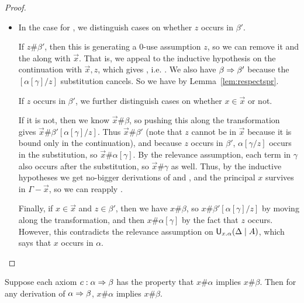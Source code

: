 \begin{proof}
\begin{itemize}
\item In the case for \UL, we distinguish cases on whether $z$ occurs in
  $\beta'$.  

  If $z \# \beta'$, then this \UL is generating a 0-use assumption $z$, so
  we can remove it and the \UL along with $\vec{x}$.  That is, we appeal
  to the inductive hypothesis on the continuation with $\vec{x},z$,
  which gives , i.e.
  .  We also have $\beta \Rightarrow \beta'$
  because the $[\alpha[\gamma]/z]$ substitution cancels.  So we have
   by Lemma~\ref{lem:respectspr}.
  
  If $z$ occurs in $\beta'$, we further distinguish cases on whether $x
  \in \vec{x}$ or not.  

  If it is not, then we know $\vec{x} \# \beta$, so pushing this along
  the transformation gives $\vec{x} \# \beta'[\alpha[\gamma]/z]$.  Thus
  $\vec{x} \# \beta'$ (note that $z$ cannot be in $\vec{x}$ because it
  is bound only in the continuation), and because $z$ occurs in
  $\beta'$, $\alpha[\gamma/z]$ occurs in the substitution, so $\vec{x}
  \# \alpha[\gamma]$.  By the relevance assumption, each term in
  $\gamma$ also occurs after the substitution, so $\vec{x} \# \gamma$ as
  well.  Thus, by the inductive hypotheses we get no-bigger derivations
  of  and
  , and the principal $x$ survives in
  $\Gamma-\vec{x}$, so we can reapply \UL.

  Finally, if $x \in \vec{x}$ and $z \in \beta'$, then we have $x \#
  \beta$, so $x \# \beta'[\alpha[\gamma]/z]$ by moving along the
  transformation, and then $x \# \alpha[\gamma]$ by the fact that $z$
  occurs.  However, this contradicts the relevance assumption on
  $\mathsf{U}_{x.\alpha}(\Delta \mid A)$, which says that $x$ occurs in $\alpha$.  
\end{itemize}

\end{proof}

\begin{lemma} \label{lem:spr-doesnt-introduce}
Suppose each axiom $c : \alpha \Rightarrow \beta$ has the property that $x \#
\alpha$ implies $x \# \beta$.  Then for any derivation of $\alpha \Rightarrow
\beta$, $x \# \alpha$ implies $x \# \beta$.
\end{lemma}

